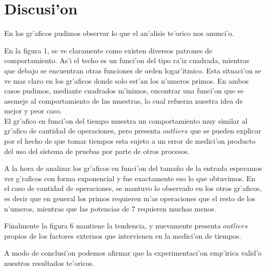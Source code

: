 \section{Discusi'on}
En los gr'aficos pudimos observar lo que el an'alisis te'orico nos anunci'o.

En la figura 1, se ve claramente como existen diversos patrones de comportamiento. As'i el techo es un funci'on del tipo ra'iz 
cuadrada, mientras que debajo se encuentran otras funciones de orden logar'itmico. Esta situaci'on se ve mas claro en los 
gr'aficos donde solo est'an los n'umeros primos. En ambos casos pudimos, mediante cuadrados m'inimos, 
encontrar una funci'on que se asemeje al comportamiento de las muestras, lo cual refuerza nuestra idea de mejor y peor caso.\\
El gr'afico en funci'on del tiempo muestra un comportamiento muy similar al gr'afico de cantidad de operaciones, pero presenta 
$outliers$ que se pueden explicar por el hecho de que tomar tiempos esta sujeto a un error de medici'on producto del uso del sistema
de pruebas por parte de otros procesos.

A la hora de analizar los gr'aficos en funci'on del tama\~{n}o de la entrada esperamos ver g'raficos con forma exponencial 
y fue exactamente eso lo que obtuvimos. En el caso de cantidad de operaciones, se mantuvo lo observado en los otros gr'aficos, 
es decir que en general los primos requieren m'as operaciones que el resto de los n'umeros, mientras que las potencias de 7 
requieren muchas menos.

Finalmente la figura 6 mantiene la tendencia, y nuevamente presenta $outliers$ propios de los factores externos que intervienen 
en la medici'on de tiempos.

A modo de conclusi'on podemos afirmar que la experimentaci'on emp'irica valid'o nuestros resultados te'oricos.
